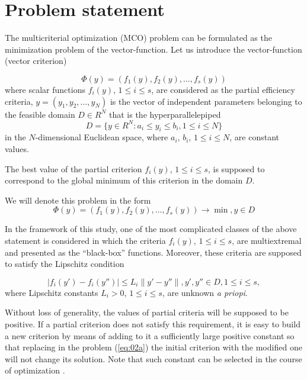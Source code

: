 \documentclass[runningheads]{llncs}
\begin{document}
\section{Problem statement}
\label{sec:2}

The multicriterial optimization (MCO) problem can be formulated as the minimization problem of the vector-function. Let us introduce the vector-function (vector criterion)

\begin{equation}
\label{eq:01}
  \Phi(y) = (f_1 (y),f_2 (y), \dots, f_s(y))
\end{equation}
where scalar functions $f_i(y)$, $1 \leq i \leq s$, are considered as the partial efficiency criteria, $y=(y_1,y_2, \dots ,y_N)$ is the vector of independent parameters belonging to the feasible domain $D \in R^N$ that is the hyperparallelepiped
\begin{equation}
\label{eq:02}
    D=\{y \in R^N : a_i \leq y_i \leq b_i, 1 \leq i \leq N\}
\end{equation}
in the $N$-dimensional Euclidean space, where $a_i$, $b_i$, $1 \leq i \leq N$, are constant values.

The best value of the partial criterion $f_i(y)$, $1 \leq i \leq s$, is supposed to correspond to the global minimum of this criterion in the domain $D$.

We will denote this problem in the form
\begin{equation}
\label{eq:02a}
  \Phi(y) = (f_1 (y),f_2 (y), \dots, f_s(y)) \to \min, y \in D
\end{equation}

In the framework of this study, one of the most complicated classes of the above statement is considered in which the criteria $f_i(y)$, $1 \leq i \leq s$, are multiextremal and presented as the ``black-box'' functions. Moreover, these criteria are supposed to satisfy the Lipschitz condition

\begin{equation}
\label{eq:03}
|f_i (y') - f_i (y'')| \leq L_i \|y' - y''\| ,y',y'' \in D, 1 \leq i \leq s,
\end{equation}
where Lipschitz constants $L_i>0$, $1 \leq i \leq s$, are unknown \textit{a priopi}.  

Without loss of generality, the values of partial criteria will be supposed to be positive. If a partial criterion does not satisfy this requirement, it is easy to build a new criterion by means of adding to it a sufficiently large positive constant so that replacing in the problem (\ref{eq:02a}) the initial criterion with the modified one will not change its solution. Note that such constant can be selected in the course of optimization \cite{ML_MCO_2023}.
\end{document}
